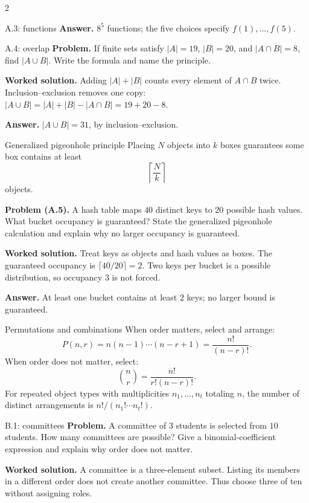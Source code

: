 \documentclass[10pt]{article}
\begin{document}
\begin{multicols}{2}
\begin{workedbox}{A.3: functions}
\textbf{Answer.} $8^5$ functions; the five choices specify $f(1),\ldots,f(5)$.
\end{workedbox}

\begin{workedbox}{A.4: overlap}
\textbf{Problem.} If finite sets satisfy $|A|=19$, $|B|=20$, and $|A\cap B|=8$, find $|A\cup B|$. Write the formula and name the principle.

\textbf{Worked solution.} Adding $|A|+|B|$ counts every element of $A\cap B$ twice. Inclusion--exclusion removes one copy: $|A\cup B|=|A|+|B|-|A\cap B|=19+20-8$.

\textbf{Answer.} $|A\cup B|=31$, by inclusion--exclusion.
\end{workedbox}

\begin{definitionbox}{Generalized pigeonhole principle}
Placing $N$ objects into $k$ boxes guarantees some box contains at least
\[
\left\lceil\frac Nk\right\rceil
\]
objects.

\textbf{Problem (A.5).} A hash table maps $40$ distinct keys to $20$ possible hash values. What bucket occupancy is guaranteed? State the generalized pigeonhole calculation and explain why no larger occupancy is guaranteed.

\textbf{Worked solution.} Treat keys as objects and hash values as boxes. The guaranteed occupancy is $\lceil40/20\rceil=2$. Two keys per bucket is a possible distribution, so occupancy $3$ is not forced.

\textbf{Answer.} At least one bucket contains at least $2$ keys; no larger bound is guaranteed.
\end{definitionbox}


\begin{definitionbox}{Permutations and combinations}
When order matters, select and arrange:
\[
P(n,r)=n(n-1)\cdots(n-r+1)=\frac{n!}{(n-r)!}.
\]
When order does not matter, select:
\[
\binom nr=\frac{n!}{r!(n-r)!}.
\]
For repeated object types with multiplicities $n_1,\ldots,n_t$ totaling $n$,
the number of distinct arrangements is $n!/(n_1!\cdots n_t!)$.
\end{definitionbox}

\begin{workedbox}{B.1: committees}
\textbf{Problem.} A committee of $3$ students is selected from $10$ students. How many committees are possible? Give a binomial-coefficient expression and explain why order does not matter.

\textbf{Worked solution.} A committee is a three-element subset. Listing its members in a different order does not create another committee. Thus choose three of ten without assigning roles.


\end{workedbox}
\end{multicols}
\end{document}
